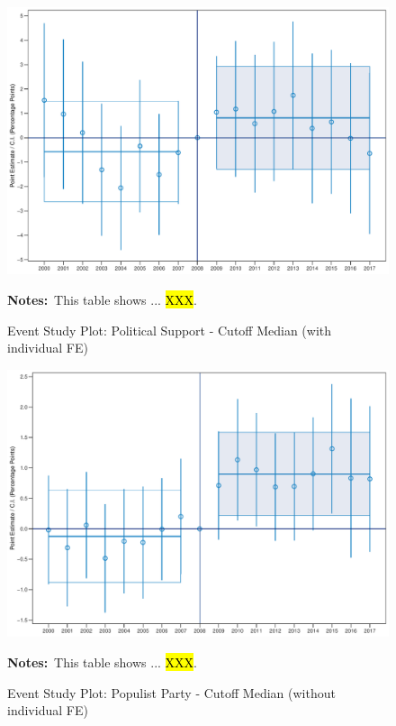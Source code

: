 \documentclass[11pt]{article}
\begin{document}
\begin{figure}[htbp!]
    \centering
    \caption{Event Study Plot: Political Support - Cutoff Median (with individual FE)}\label{fig:dynamic_did_cbk_past_mean_ps_p50_ife}
    \includegraphics[width=1\linewidth]{events/dynamic_did_cbk_past_mean_ps_p50_ife}
    \begin{tablenotes}
        \footnotesize
        \item \textbf{Notes:}~This table shows ... \hl{XXX}.
    \end{tablenotes} 
\end{figure}

\begin{figure}[htbp!]
    \centering
    \caption{Event Study Plot: Populist Party - Cutoff Median (without individual FE)}\label{fig:dynamic_did_cbk_past_mean_pp_p50_noife}
    \includegraphics[width=1\linewidth]{events/dynamic_did_cbk_past_mean_pp_p50_noife}
    \begin{tablenotes}
        \footnotesize
        \item \textbf{Notes:}~This table shows ... \hl{XXX}.
    \end{tablenotes} 
\end{figure}
\end{document}
